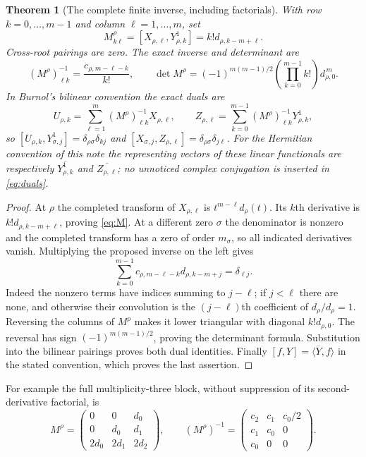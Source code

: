 \documentclass[11pt]{article}
\newtheorem{theorem}{Theorem}[section]
\begin{document}
\begin{theorem}[The complete finite inverse, including factorials]
\label{thm:jets}
With row $k=0,\ldots,m-1$ and column $\ell=1,\ldots,m$, set
\begin{equation}\label{eq:M}
 M^\rho_{k\ell}=[X_{\rho,\ell},Y^1_{\rho,k}]
        =k!d_{\rho,k-m+\ell}.
\end{equation}
Cross-root pairings are zero. The exact inverse and determinant are
\begin{equation}\label{eq:Minv}
 (M^\rho)^{-1}_{\ell k}=\frac{c_{\rho,m-\ell-k}}{k!},\qquad
 \det M^\rho=(-1)^{m(m-1)/2}
              \left(\prod_{k=0}^{m-1}k!\right)d_{\rho,0}^{\,m}.
\end{equation}
In Burnol's bilinear convention the exact duals are
\begin{equation}\label{eq:duals}
 U_{\rho,k}=\sum_{\ell=1}^{m}(M^\rho)^{-1}_{\ell k}X_{\rho,\ell},
 \qquad
 Z_{\rho,\ell}=\sum_{k=0}^{m-1}(M^\rho)^{-1}_{\ell k}Y^1_{\rho,k},
\end{equation}
so $[U_{\rho,k},Y^1_{\sigma,j}]=\delta_{\rho\sigma}\delta_{kj}$
and $[X_{\sigma,j},Z_{\rho,\ell}]=\delta_{\rho\sigma}\delta_{j\ell}$.
For the Hermitian convention of this note the representing vectors
of these linear functionals are respectively
$\overline{Y^1_{\rho,k}}$ and $\overline{Z_{\rho,\ell}}$;
no unnoticed complex conjugation is inserted in \eqref{eq:duals}.
\end{theorem}
\begin{proof}
At $\rho$ the completed transform of $X_{\rho,\ell}$ is
$t^{m-\ell}d_\rho(t)$. Its $k$th derivative is
$k!d_{\rho,k-m+\ell}$, proving \eqref{eq:M}.
At a different zero $\sigma$ the denominator is nonzero and
the completed transform has a zero of order $m_\sigma$,
so all indicated derivatives vanish. Multiplying the proposed
inverse on the left gives
\[
 \sum_{k=0}^{m-1}c_{\rho,m-\ell-k}d_{\rho,k-m+j}
       =\delta_{\ell j}.
\]
Indeed the nonzero terms have indices summing to $j-\ell$;
if $j<\ell$ there are none, and otherwise their convolution
is the $(j-\ell)$th coefficient of $d_\rho/d_\rho=1$.
Reversing the columns of $M^\rho$ makes it lower triangular
with diagonal $k!d_{\rho,0}$. The reversal has sign
$(-1)^{m(m-1)/2}$, proving the determinant formula.
Substitution into the bilinear pairings proves both dual
identities. Finally $[f,Y]=\langle\overline Y,f\rangle$
in the stated convention, which proves the last assertion.
\end{proof}

For example the full multiplicity-three block, without suppression
of its second-derivative factorial, is
\[
 M^\rho=\begin{pmatrix}0&0&d_0\\0&d_0&d_1\\
                         2d_0&2d_1&2d_2\end{pmatrix},\qquad
 (M^\rho)^{-1}=\begin{pmatrix}c_2&c_1&c_0/2\\
                           c_1&c_0&0\\c_0&0&0\end{pmatrix}.
\]
\end{document}
